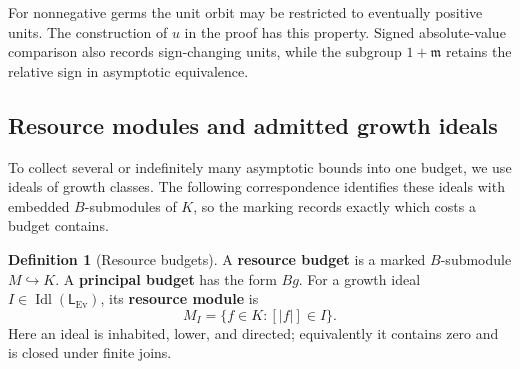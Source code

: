 \documentclass[11pt,a4paper]{article}
\numberwithin{algorithm}{section}
\numberwithin{equation}{section}
\theoremstyle{definition}
\newtheorem{definition}[definition]{Definition}
\theoremstyle{remark}
\theoremstyle{plain}
\newcommand{\Idl}{\operatorname{Idl}}
\newcommand{\incl}{\hookrightarrow}
\newcommand{\Ev}{{\operatorname{Ev}}}
\newcommand{\abs}[1]{\lvert #1\rvert}
\theoremstyle{definition}
\theoremstyle{plain}
\begin{document}
For nonnegative germs the unit orbit may be restricted to
eventually positive units. The construction of $u$ in the proof
has this property. Signed absolute-value comparison also records
sign-changing units, while the subgroup $1+\mathfrak m$ retains
the relative sign in asymptotic equivalence.

\subsection{Resource modules and admitted growth ideals}
\label{sec:resources}
To collect several or indefinitely many asymptotic bounds into one
budget, we use ideals of growth classes.
The following correspondence identifies these ideals with embedded
$B$-submodules of $K$, so the marking records exactly which costs a
budget contains. 

\begin{definition}[Resource budgets]\label{def:resource-budgets}
A \textbf{resource budget} is a marked $B$-submodule $M\incl K$.
A \textbf{principal budget} has the form $Bg$. For a growth ideal
$I\in\Idl(\mathsf L_{\Ev})$, its \textbf{resource module} is
\[
 M_I=\{f\in K:[\abs f]\in I\}.
\]
Here an ideal is inhabited, lower, and directed; equivalently
it contains zero and is closed under finite joins.
\end{definition}
\end{document}
